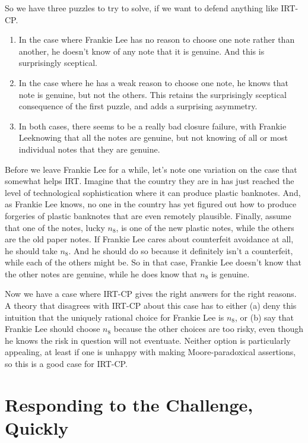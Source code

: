 \documentclass[11pt,]{book}
\providecommand{\tightlist}{%
  \setlength{\itemsep}{0pt}\setlength{\parskip}{0pt}}
\begin{document}
So we have three puzzles to try to solve, if we want to defend anything like IRT-CP.

\begin{enumerate}
\def\labelenumi{\arabic{enumi}.}
\tightlist
\item
  In the case where Frankie Lee has no reason to choose one note rather than another, he doesn't know of any note that it is genuine. And this is surprisingly sceptical.
\item
  In the case where he has a weak reason to choose one note, he knows that note is genuine, but not the others. This retains the surprisingly sceptical consequence of the first puzzle, and adds a surprising asymmetry.
\item
  In both cases, there seems to be a really bad closure failure, with Frankie Leeknowing that all the notes are genuine, but not knowing of all or most individual notes that they are genuine.
\end{enumerate}

Before we leave Frankie Lee for a while, let's note one variation on the case that somewhat helps IRT. Imagine that the country they are in has just reached the level of technological sophistication where it can produce plastic banknotes. And, as Frankie Lee knows, no one in the country has yet figured out how to produce forgeries of plastic banknotes that are even remotely plausible. Finally, assume that one of the notes, lucky \(n_8\), is one of the new plastic notes, while the others are the old paper notes. If Frankie Lee cares about counterfeit avoidance at all, he should take \(n_8\). And he should do so because it definitely isn't a counterfeit, while each of the others might be. So in that case, Frankie Lee doesn't know that the other notes are genuine, while he does know that \(n_8\) is genuine.

Now we have a case where IRT-CP gives the right answers for the right reasons. A theory that disagrees with IRT-CP about this case has to either (a) deny this intuition that the uniquely rational choice for Frankie Lee is \(n_8\), or (b) say that Frankie Lee should choose \(n_8\) because the other choices are too risky, even though he knows the risk in question will not eventuate. Neither option is particularly appealing, at least if one is unhappy with making Moore-paradoxical assertions, so this is a good case for IRT-CP.

\hypertarget{tiesresponse}{%
\section{Responding to the Challenge, Quickly}\label{tiesresponse}}
\end{document}
